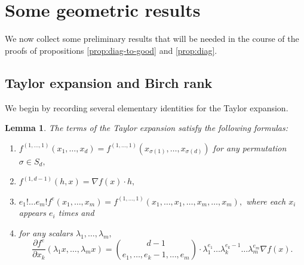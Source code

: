 \documentclass[10pt,a4paper]{amsart}
\newtheorem{lemma}[theorem]{Lemma}
\theoremstyle{definition}
\begin{document}
\section{Some geometric results}

We now collect some preliminary results that will be needed in the course of the proofs of propositions \ref{prop:diag-to-good} and \ref{prop:diag}.

\subsection{Taylor expansion and Birch rank} We begin by recording several elementary identities for the Taylor expansion.

\begin{lemma}\label{lem:Taylor-identities} 
    The terms of the Taylor expansion satisfy the following formulas:
    \begin{enumerate}
        \item $f^{(1,\ldots,1)}(x_1,\ldots,x_d) = f^{(1,\ldots,1)}(x_{\sigma(1)},\ldots,x_{\sigma(d)})$ for any permutation $\sigma\in S_d,$ 
        \item $f^{(1,d-1)}(h,x) = \nabla f(x) \cdot h,$
        \item $e_1!\ldots e_m!f^e(x_1,\ldots,x_m) = f^{(1,\ldots,1)} (x_1,\ldots,x_1,\ldots,x_m,\ldots,x_m),$ where each $x_i$ appears $e_i$ times and
        \item   for any scalars $\lambda_1,\ldots,\lambda_m,$   
        \[
            \frac{\partial f^e }{\partial x_k}(\lambda_1 x,\ldots, \lambda_m x) = \binom{d-1}{e_1,\ldots,e_k-1,\ldots,e_m} \cdot \lambda_1^{e_1}\ldots\lambda_k^{e_k-1}\ldots\lambda_m^{e_m} \nabla f(x).
        \]
        
    \end{enumerate}
\end{lemma}
\end{document}
